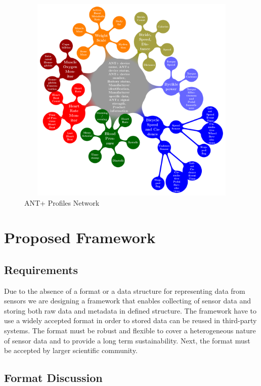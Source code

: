 \documentclass[conference]{IEEEtran}
\begin{document}
\begin{figure}
\centering\includegraphics[width=12cm, height=10cm]{AntPlusProfiles}
\caption{\label{AntPlus}ANT+ Profiles Network}
\end{figure}


\section{Proposed Framework}\label{sec:framework}

\subsection{Requirements}\label{sec:requirements}

Due to the absence of a format or a data structure for representing data from sensors we are designing a framework that enables collecting of sensor data and storing both raw data and metadata in defined structure. The framework have to use a widely accepted format in order to stored data can be reused in third-party systems. The format must be robust and flexible to cover a heterogeneous nature of sensor data and to provide a long term sustainability. Next, the format must be accepted by larger scientific community. 

\subsection{Format Discussion}
\end{document}
